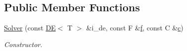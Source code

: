 \subsection*{Public Member Functions}
\begin{DoxyCompactItemize}
\item 
\hyperlink{classea_1_1_solver_3_01_d_e_00_01_t_00_01_f_00_01_c_01_4_ae960a525f47309ff0d90f8ac404e3599}{Solver} (const \hyperlink{structea_1_1_d_e}{DE}$<$ T $>$ \&i\+\_\+de, const F \&\hyperlink{classea_1_1_solver__base_ae0a893780c93dfe17c1d17301de6494f}{f}, const C \&\hyperlink{classea_1_1_solver__base_a6914e89d30e7484f2b4af1783f0de8c3}{c})
\begin{DoxyCompactList}\small\item\em Constructor. \end{DoxyCompactList}\end{DoxyCompactItemize}
